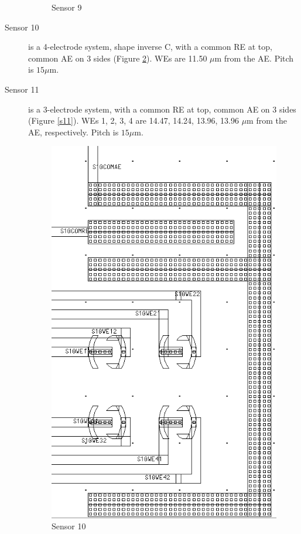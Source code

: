 \begin{description}
\begin{figure}
\begin{minipage}{0.5\linewidth}
		\caption{Sensor 9}
		\label{s09}
	\end{minipage}
\end{figure}

\item[Sensor 10] is a 4-electrode system, shape inverse C, with a common RE at top, common AE on 3 sides (Figure \ref{s10}). WEs are 11.50 $\mu \mathrm{m}$ from the AE. Pitch is $15 \mu \mathrm{m}$.
\item[Sensor 11] is a 3-electrode system, with a common RE at top, common AE on 3 sides (Figure \ref{s11}). WEs 1, 2, 3, 4 are 14.47, 14.24, 13.96, 13.96 $\mu \mathrm{m}$ from the AE, respectively. Pitch is $15 \mu \mathrm{m}$.

\begin{figure}
	\begin{minipage}{0.5\linewidth}
		\centering
		\includegraphics[width=0.6\linewidth]{figures/s10.png}
		\caption{Sensor 10}
		\label{s10}
	\end{minipage}
	\begin{minipage}{0.5\linewidth}
		\centering

\end{minipage}
\end{figure}
\end{description}
